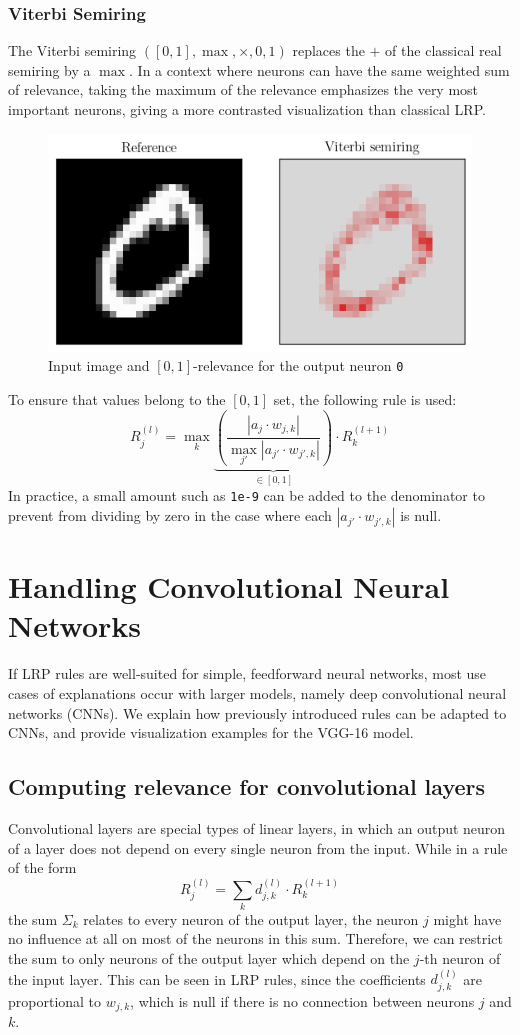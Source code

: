 \documentclass{../cs-classes/cs-classes}
\newcommand*{\1}{\digitsbb{1}}
\newcommand*{\0}{\digitsbb{0}}
\begin{document}
\subsubsection{Viterbi Semiring}
The Viterbi semiring $([0, 1], \max, \times, 0, 1)$ replaces the $+$ of the classical real semiring by a $\max$. In a context where neurons can have the same weighted sum of relevance, taking the maximum of the relevance emphasizes the very most important neurons, giving a more contrasted visualization than classical LRP. 
\begin{figure}[H]
    \centering
    \includegraphics[width=.5\textwidth]{viterbi.png}
    \caption{Input image and $[0, 1]$-relevance for the output neuron \texttt{0}}
\end{figure}
To ensure that values belong to the $[0, 1]$ set, the following rule is used:
\begin{equation}
    R^{(l)}_j = \max_k \underbrace{\left(\frac{\left|a_j\cdot w_{j, k}\right|}{\max_{j'} \left|a_{j'}\cdot w_{j', k}\right|}\right)}_{\in[0, 1]} \cdot R^{(l+1)}_k
\end{equation}
In practice, a small amount such as \texttt{1e-9} can be added to the denominator to prevent from dividing by zero in the case where each $|a_{j'}\cdot w_{j',k}|$ is null.

\section{Handling Convolutional Neural Networks}
If LRP rules are well-suited for simple, feedforward neural networks, most use cases of explanations occur with larger models, namely deep convolutional neural networks (CNNs). We explain how previously introduced rules can be adapted to CNNs, and provide visualization examples for the VGG-16 model.

\subsection{Computing relevance for convolutional layers}
Convolutional layers are special types of linear layers, in which an output neuron of a layer does not depend on every single neuron from the input. While in a rule of the form
\begin{equation*}
    R_j^{(l)} = \sum_k d_{j, k}^{(l)} \cdot R_k^{(l+1)}
\end{equation*}
the sum $\Sigma_k$ relates to every neuron of the output layer, the neuron $j$ might have no influence at all on most of the neurons in this sum. Therefore, we can restrict the sum to only neurons of the output layer which depend on the $j$-th neuron of the input layer. This can be seen in LRP rules, since the coefficients $d_{j, k}^{(l)}$ are proportional to $w_{j,k}$, which is null if there is no connection between neurons $j$ and $k$. 
\end{document}

